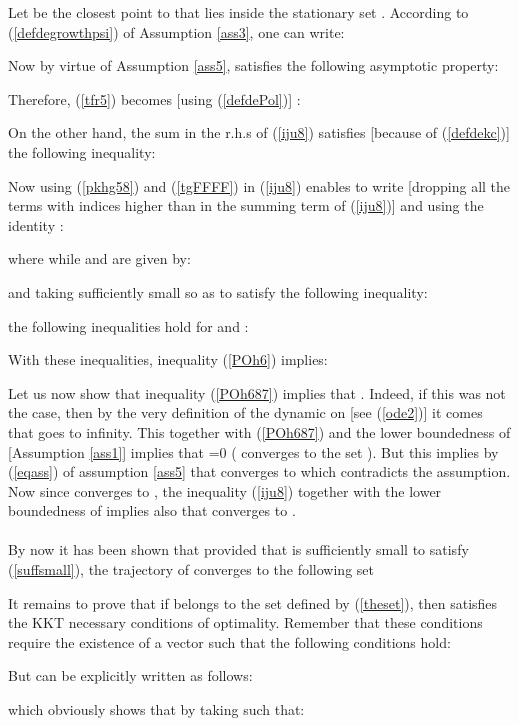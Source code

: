 \documentclass{article}
\begin{document}
Let  be the closest point to  that lies inside the stationary set . According to (\ref{defdegrowthpsi}) of Assumption \ref{ass3}, one can write:
  
Now by virtue of Assumption \ref{ass5},  satisfies the following asymptotic property:
 
Therefore, (\ref{tfr5}) becomes [using (\ref{defdePol})] :
 
On the other hand, the sum in the r.h.s of (\ref{iju8}) satisfies [because of (\ref{defdekc})] the following inequality:
 
Now using (\ref{pkhg58})  and (\ref{tgFFFF}) in (\ref{iju8}) enables to write [dropping all the terms with indices higher than  in the summing term of (\ref{iju8})] and using the identity :
 
where  while  and  are given by:
 
and taking  sufficiently small so as to satisfy the following inequality:
 
the following inequalities hold for  and :
 
With these inequalities, inequality (\ref{POh6}) implies:
 
Let us now show that inequality  (\ref{POh687}) implies that . Indeed, if this was not the case, then by the very definition of the dynamic on  [see (\ref{ode2})] it comes that  goes to infinity. This together with (\ref{POh687}) and the lower boundedness of  [Assumption \ref{ass1}] implies that =0 ( converges to the set ). But this implies by (\ref{eqass}) of assumption \ref{ass5} that  converges to  which  contradicts the assumption. Now since  converges to , the inequality (\ref{iju8}) together with the lower boundedness of  implies also that  converges to .\ \\ \ \\ 
By now it has  been shown that provided that  is sufficiently small to satisfy (\ref{suffsmall}), the trajectory of  converges to the following set
 
It remains to prove that if  belongs to the set defined by (\ref{theset}), then  satisfies the KKT necessary conditions of optimality. Remember that these conditions require the existence of a vector  such that the following conditions hold:
 
But  can be explicitly written as follows:
 
which obviously shows that by taking  such that:
 
\end{document}
